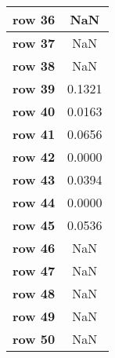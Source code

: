 \begin{tiny}
\begin{tabular}{|l|c|}
\textbf{row 36}&NaN\\\hline
\textbf{row 37}&NaN\\\hline
\textbf{row 38}&NaN\\\hline
\textbf{row 39}&0.1321\\\hline
\textbf{row 40}&0.0163\\\hline
\textbf{row 41}&0.0656\\\hline
\textbf{row 42}&0.0000\\\hline
\textbf{row 43}&0.0394\\\hline
\textbf{row 44}&0.0000\\\hline
\textbf{row 45}&0.0536\\\hline
\textbf{row 46}&NaN\\\hline
\textbf{row 47}&NaN\\\hline
\textbf{row 48}&NaN\\\hline
\textbf{row 49}&NaN\\\hline
\textbf{row 50}&NaN\\\hline
\end{tabular}
\end{tiny}